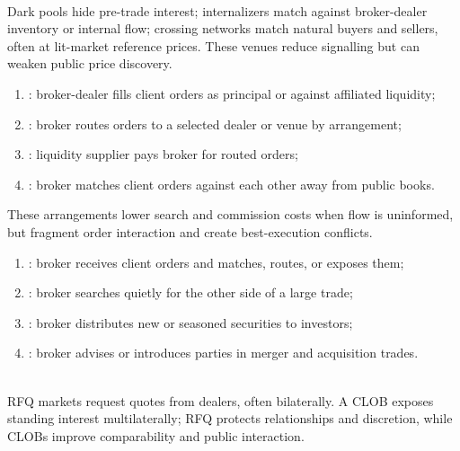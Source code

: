 \documentclass[a4paper,oneside,openany]{book}
\begin{document}
\begin{taxonomy} \\
Dark pools hide pre-trade interest; internalizers match against broker-dealer inventory or internal flow; crossing networks match natural buyers and sellers, often at lit-market reference prices. These venues reduce signalling but can weaken public price discovery.
\end{taxonomy}

\begin{taxonomy} 
\begin{enumerate}[label=\roman*.]
\setlength{\itemsep}{0pt}
\item {}: broker-dealer fills client orders as principal or against affiliated liquidity;
\item {}: broker routes orders to a selected dealer or venue by arrangement;
\item {}: liquidity supplier pays broker for routed orders;
\item {}: broker matches client orders against each other away from public books.
\end{enumerate}
These arrangements lower search and commission costs when flow is uninformed, but fragment order interaction and create best-execution conflicts.
\end{taxonomy}

\begin{taxonomy} 
\begin{enumerate}[label=\roman*.]
\setlength{\itemsep}{0pt}
\item {}: broker receives client orders and matches, routes, or exposes them;
\item {}: broker searches quietly for the other side of a large trade;
\item {}: broker distributes new or seasoned securities to investors;
\item {}: broker advises or introduces parties in merger and acquisition trades.
\end{enumerate}
\end{taxonomy}

\begin{taxonomy} \\
RFQ markets request quotes from dealers, often bilaterally. A CLOB exposes standing interest multilaterally; RFQ protects relationships and discretion, while CLOBs improve comparability and public interaction.
\end{taxonomy}
\end{document}
